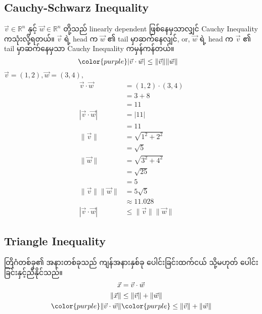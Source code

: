 \subsection{Cauchy-Schwarz Inequality}
$\vec{v}\in\mathbb{R}^n$ နှင့် $\vec{w}\in\mathbb{R}^n$ တို့သည် linearly dependent ဖြစ်နေမှသာလျှင် Cauchy Inequality ကသုံးလို့ရတယ်။ $\vec{v}$ ရဲ့ head က $\vec{w}$ ၏ tail မှာဆက်နေလျင်, or, $\vec{w}$ ရဲ့ head က $\vec{v}$ ၏ tail မှာဆက်နေမှသာ Cauchy Inequality ကမှန်ကန်တယ်။
\begin{equation}
    {\color{purple} \begin{split}
            |\vec{v}\cdot\vec{w}| & \le\|\vec{v}\|\|\vec{w}\|
        \end{split}}
\end{equation}
$\vec{v}=(1,2), \vec{w}=(3,4),$
\[
    \begin{split}
        \vec{v}\cdot\vec{w}   & =(1,2)\cdot(3,4) \\
                              & =3+8             \\
                              & =11              \\
        |\vec{v}\cdot\vec{w}| & =|11|            \\
                              & =11              \\
        \|\vec{v}\|           & =\sqrt{1^2+2^2}  \\
                              & =\sqrt{5}          \\
        \|\vec{w}\|           & =\sqrt{3^2+4^2}  \\
                              & =\sqrt{25}       \\
                              & =5 \\
        \|\vec{v}\|\|\vec{w}\|&=5\sqrt{5} \\
        & \approx 11.028 \\
        |\vec{v}\cdot\vec{w}|&\le\|\vec{v}\|\|\vec{w}\|
    \end{split}
\]

\subsection{Triangle Inequality}
တြိဂံတစ်ခု၏ အနားတစ်ခုသည် ကျန်အနားနှစ်ခု ပေါင်းခြင်းထက်ငယ် သို့မဟုတ် ပေါင်းခြင်းနှင့်ညီနိုင်သည်။
\begin{equation}
    \begin{split}
        \vec{x}&=\vec{v}\cdot\vec{w} \\
        \|\vec{x}\|&\le\|\vec{v}\|+\|\vec{w}\| \\
        {\color{purple} \|\vec{v}\cdot\vec{w}\|}&{\color{purple} \le\|\vec{v}\|+\|\vec{w}\|}
    \end{split}
\end{equation}

